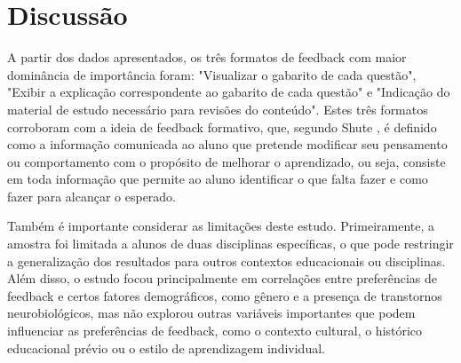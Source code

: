 \section{Discussão}

A partir dos dados apresentados, os três formatos de feedback com maior dominância de importância foram: "Visualizar o gabarito de cada questão", "Exibir a explicação correspondente ao gabarito de cada questão" e "Indicação do material de estudo necessário para revisões do conteúdo". Estes três formatos corroboram com a ideia de feedback formativo, que, segundo Shute \cite{shute2008focus}, é definido como a informação comunicada ao aluno que pretende modificar seu pensamento ou comportamento com o propósito de melhorar o aprendizado, ou seja, consiste em toda informação que permite ao aluno identificar o que falta fazer e como fazer para alcançar o esperado.

Também é importante considerar as limitações deste estudo. Primeiramente, a amostra foi limitada a alunos de duas disciplinas específicas, o que pode restringir a generalização dos resultados para outros contextos educacionais ou disciplinas. Além disso, o estudo focou principalmente em correlações entre preferências de feedback e certos fatores demográficos, como gênero e a presença de transtornos neurobiológicos, mas não explorou outras variáveis importantes que podem influenciar as preferências de feedback, como o contexto cultural, o histórico educacional prévio ou o estilo de aprendizagem individual.